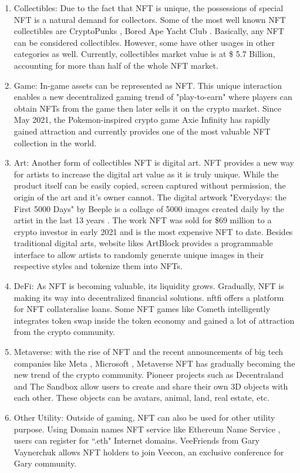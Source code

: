 \documentclass[12pt]{article}
\begin{document}
\begin{enumerate}
\item Collectibles: Due to the fact that NFT is unique, the possessions of special NFT is a natural demand for collectors. Some of the most well known NFT collectibles are CryptoPunks \cite{cryptopunks}, Bored Ape Yacht Club \cite{bayc}. Basically, any NFT can be considered collectibles. However, some have other usages in other categories as well. Currently, collectibles market value is at \$ 5.7 Billion, accounting for more than half of the whole NFT market.
\item Game: In-game assets can be represented as NFT. This unique interaction enables a new decentralized gaming trend of "play-to-earn" where players can obtain NFTs from the game then later sells it on the crypto market. Since May 2021, the Pokemon-inspired crypto game Axie Infinity \cite{axie} has rapidly gained attraction and currently provides one of the most valuable NFT collection in the world.
\item Art: Another form of collectibles NFT is digital art. NFT provides a new way for artists to increase the digital art value as it is truly unique. While the product itself can be easily copied, screen captured without permission, the origin of the art and it's owner cannot. The digital artwork "Everydays: the First 5000 Days" by Beeple is a collage of 5000 images created daily by the artist in the last 13 years \cite{beeple}. The work NFT was sold for \$69 million to a crypto investor in early 2021 and is the most expensive NFT to date. Besides traditional digital arts, website likes ArtBlock \cite{artblock} provides a programmable interface to allow artists to randomly generate unique images in their respective styles and tokenize them into NFTs. 
\item DeFi: As NFT is becoming valuable, its liquidity grows. Gradually, NFT is making its way into decentralized financial solutions. nftfi \cite {nftfi} offers a platform for NFT collateralise loans. Some NFT games like Cometh \cite{cometh} intelligently integrates token swap inside the token economy and gained a lot of attraction from the crypto community.  
\item Metaverse: with the rise of NFT and the recent announcements of big tech companies like Meta \cite{facebook}, Microsoft \cite{microsoft}, Metaverse NFT has gradually becoming the new trend of the crypto community. Pioneer projects such as Decentraland \cite{decentraland} and The Sandbox \cite{sandbox} allow users to create and share their own 3D objects with each other. These objects can be avatars, animal, land, real estate, etc. 
\item Other Utility: Outside of gaming, NFT can also be used for other utility purpose. Using Domain names NFT service like Ethereum Name Service \cite{ens}, users can register for ``.eth" Internet domains. VeeFriends \cite{vee} from Gary Vaynerchuk allows NFT holders to join Veecon, an exclusive conference for Gary community.
\end{enumerate}
\end{document}
